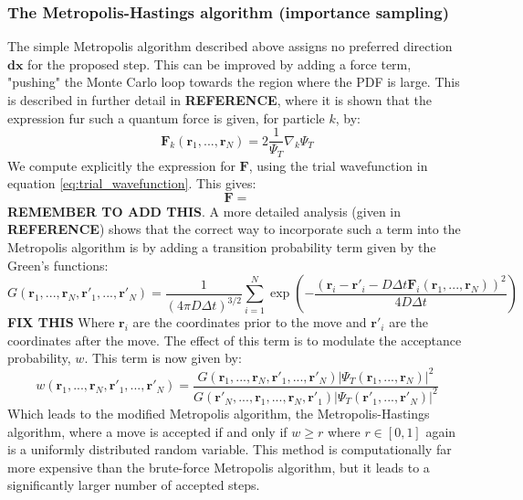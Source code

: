 \documentclass[a4paper, 10pt]{article}
\begin{document}
	\subsubsection{The Metropolis-Hastings algorithm (importance sampling)}
	The simple Metropolis algorithm described above assigns no preferred direction $\boldsymbol{dx}$ for the proposed step. This can be improved by adding a force term, "pushing" the Monte Carlo loop towards the region where the PDF is large. This is described in further detail in \textbf{REFERENCE}, where it is shown that the expression fur such a quantum force is given, for particle $k$, by:
	\begin{equation}
	\boldsymbol{F}_k(\boldsymbol{r}_1, ..., \boldsymbol{r}_N)=2\frac{1}{\Psi_T}\nabla_k \Psi_T
	\end{equation}
	We compute explicitly the expression for $\boldsymbol{F}$, using the trial wavefunction in equation \ref{eq:trial_wavefunction}. This gives:
	\begin{equation}
	\boldsymbol{F}=
	\end{equation}
	\textbf{REMEMBER TO ADD THIS}. A more detailed analysis (given in \textbf{REFERENCE}) shows that the correct way to incorporate such a term into the Metropolis algorithm is by adding a transition probability term given by the Green's functions:
	\begin{equation}
	G(\boldsymbol{r}_1,...,\boldsymbol{r}_N,\boldsymbol{r'}_1,...,\boldsymbol{r'}_N)=\frac{1}{(4\pi D \Delta t)^{3/2}}\sum_{i=1}^N \exp \left(-\frac{(\boldsymbol{r}_i-\boldsymbol{r'}_i-D\Delta t\boldsymbol{F}_i(\boldsymbol{r}_1,...,\boldsymbol{r}_N))^2}{4D\Delta t}\right)
	\end{equation}
	\textbf{FIX THIS} Where $\boldsymbol{r}_i$ are the coordinates prior to the move and $\boldsymbol{r'}_i$ are the coordinates after the move. The effect of this term is to modulate the acceptance probability, $w$. This term is now given by:
	\begin{equation}
	w(\boldsymbol{r}_1,...,\boldsymbol{r}_N,\boldsymbol{r'}_1,...,\boldsymbol{r'}_N)=\frac{G(\boldsymbol{r}_1,...,\boldsymbol{r}_N,\boldsymbol{r'}_1,...,\boldsymbol{r'}_N)|\Psi_T(\boldsymbol{r}_1,...,\boldsymbol{r}_N)|^2}{G(\boldsymbol{r'}_N,...,\boldsymbol{r}_1,...,\boldsymbol{r}_N,\boldsymbol{r'}_1)|\Psi_T(\boldsymbol{r'}_1,...,\boldsymbol{r'}_N)|^2}
	\end{equation}
	Which leads to the modified Metropolis algorithm, the Metropolis-Hastings algorithm, where a move is accepted if and only if $w\geq r$ where $r\in [0,1]$ again is a uniformly distributed random variable. This method is computationally far more expensive than the brute-force Metropolis algorithm, but it leads to a  significantly larger number of accepted steps.
\end{document}
